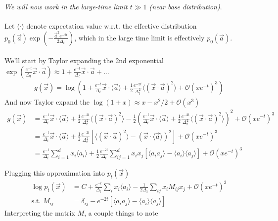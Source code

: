 \documentclass[12pt,fleqn]{article}
\numberwithin{equation}{section} %
\begin{document}
\begin{sidework}
	\emph{We will now work in the large-time limit $t \gg 1$ (near base distribution)}.\\
	\\
	Let $\langle \cdot \rangle$ denote expectation value w.r.t. the effective distribution $p_0(\vec a) \exp(-\frac{\vec a^2 e^{-2t}}{2\Delta_t})$, which in the large time limit is effectively $p_0(\vec a)$. \\
	\\
	We'll start by Taylor expanding the 2nd exponential $\exp(\frac{e^{-t}}{\Delta_t} \vec x \cdot \vec a) \approx 1 + \frac{e^{-t}}{\Delta_t} \vec x\cdot \vec a + ...$
\begin{align}
	g(\vec x) = \log \left (1 + \frac{e^{-t}}{\Delta_t} \vec x \cdot \langle \vec a \rangle  + \frac{1}{2} \frac{e^{-2t}}{\Delta_t^2} \langle (\vec x  \cdot \vec a)^2 \rangle +  \mathcal O(x e^{-t})^3\right)
\end{align}
And now Taylor expand the $\log (1+x) \approx x - x^2/2 + \mathcal O(x^3)$
\begin{align}
	g(\vec x) & = \frac{e^{-t}}{\Delta_t} \vec x \cdot \langle \vec a \rangle  + \frac{1}{2} \frac{e^{-2t}}{\Delta_t^2} \langle (\vec x  \cdot \vec a)^2 \rangle - \frac{1}{2} \left( \frac{e^{-t}}{\Delta_t} \vec x \cdot \langle \vec a \rangle  + \frac{1}{2} \frac{e^{-2t}}{\Delta_t^2} \langle (\vec x  \cdot \vec a)^2 \rangle\right)^2 + \mathcal O(x e^{-t})^3\\
	& = \frac{e^{-t}}{\Delta_t} \vec x \cdot \langle \vec a \rangle  + \frac{1}{2} \frac{e^{-2t}}{\Delta_t^2} \left[\langle (\vec x \cdot \vec a )^2\rangle - (\vec x \cdot \langle \vec a \rangle)^2 \right] + \mathcal O(x e^{-t})^3\\
	& = \frac{e^{-t}}{\Delta_t} \sum_{i=1}^d x_i \langle a_i\rangle + \frac{1}{2} \frac{e^{-2t}}{\Delta_t}  \sum_{ij=1}^d x_i x_j [ \langle a_i a_j\rangle - \langle a_i \rangle \langle a_j\rangle] + \mathcal O(x e^{-t})^3
\end{align}
\end{sidework}
Plugging this approximation into $p_t(\vec x)$
\begin{align}
	\log p_t(\vec x) & = C + \frac{e^{-t}}{\Delta_t} \sum_i x_i \langle a_i\rangle - \frac{1}{2\Delta_t} \sum_{ij} x_i M_{ij} x_j + \mathcal O(x e^{-t})^3\\
	\text{s.t. } M_{ij} & = \delta_{ij}  - e^{-2t} [\langle a_i a_j\rangle - \langle a_i \rangle \langle a_j\rangle]
\end{align}
Interpreting the matrix $M$, a couple things to note
\end{document}
